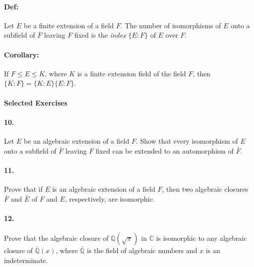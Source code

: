 \documentclass[10pt,a4paper]{article}
\begin{document}
\paragraph{Def:} Let $E$ be a finite extension of a field $F$. The number of isomorphisms of $E$ onto a subfield of $\bar{F}$ leaving $F$ fixed is the \textit{index} $\{E:F\}$ of $E$ over $F$.

\paragraph{Corollary:} If $F \leq E \leq K$, where $K$ is a finite extension field of the field $F$, then $\{K:F\} = \{K:E\}\{E:F\}$.

\paragraph{Selected Exercises}

\paragraph{10.} Let $E$ be an algebraic extension of a field $F$. Show that every isomorphism of $E$ onto a subfield of $\bar{F}$ leaving $F$ fixed can be extended to an automorphism of $\bar{F}$.

\paragraph{11.} Prove that if $E$ is an algebraic extension of a field $F$, then two algebraic closures $\bar{F}$ and $\bar{E}$ of $F$ and $E$, respectively, are isomorphic.

\paragraph{12.} Prove that the algebraic closure of $\mathbb{Q}(\sqrt{\pi})$ in $\mathbb{C}$ is isomorphic to any algebraic closure of $\bar{\mathbb{Q}}(x)$, where $\bar{\mathbb{Q}}$ is the field of algebraic numbers and $x$ is an indeterminate.
\end{document}

